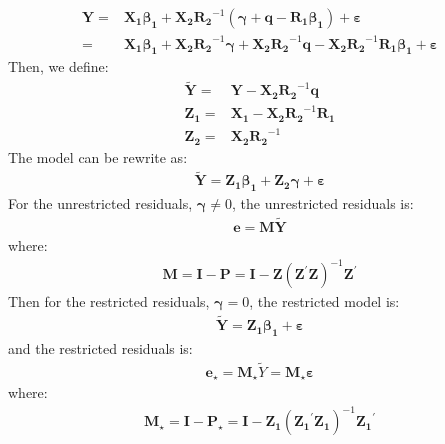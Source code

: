 \documentclass{article}
\begin{document}
	\begin{align*}
		\boldsymbol{Y} = &\boldsymbol{X_1} \boldsymbol{\beta_1} + \boldsymbol{X_2} \boldsymbol{R_2}^{-1}(\boldsymbol{\gamma} + \boldsymbol{q} - \boldsymbol{R_1}\boldsymbol{\beta_1}) + \boldsymbol{\varepsilon}\\ = &
		\boldsymbol{X_1} \boldsymbol{\beta_1} + \boldsymbol{X_2} \boldsymbol{R_2}^{-1} \boldsymbol{\gamma} + \boldsymbol{X_2} \boldsymbol{R_2}^{-1} \boldsymbol{q} - \boldsymbol{X_2} \boldsymbol{R_2}^{-1} \boldsymbol{R_1} \boldsymbol{\beta_1} + \boldsymbol{\varepsilon}
	\end{align*}
Then, we define:
	\begin{align*}
		\tilde{\boldsymbol{Y}} = &\boldsymbol{Y} - \boldsymbol{X_2} \boldsymbol{R_2}^{-1} \boldsymbol{q}\\
		\boldsymbol{Z_1} = &\boldsymbol{X_1} - \boldsymbol{X_2} \boldsymbol{R_2}^{-1} \boldsymbol{R_1}\\
		\boldsymbol{Z_2} = &\boldsymbol{X_2} \boldsymbol{R_2}^{-1}
	\end{align*}
The model can be rewrite as:
	\begin{align*}
		\tilde{\boldsymbol{Y}} = \boldsymbol{Z_1} \boldsymbol{\beta_1} + \boldsymbol{Z_2} \boldsymbol{\gamma} + \boldsymbol{\varepsilon}
	\end{align*}
For the unrestricted residuals, $\boldsymbol{\gamma} \neq 0$, the unrestricted residuals is:
 	\begin{align*}
 		\boldsymbol{e} = \boldsymbol{M} \tilde{\boldsymbol{Y}}
 	\end{align*}
 where:
 	\begin{align*}
 		\boldsymbol{M} = \boldsymbol{I} - \boldsymbol{P} = \boldsymbol{I} - \boldsymbol{Z}(\boldsymbol{Z}^\prime \boldsymbol{Z})^{-1} \boldsymbol{Z}^\prime
 	\end{align*}
Then for the restricted residuals, $\boldsymbol{\gamma} = 0$, the restricted model is:
	\begin{align*}
		\tilde{\boldsymbol{Y}} = \boldsymbol{Z_1} \boldsymbol{\beta_1} + \boldsymbol{\varepsilon}
	\end{align*}
and the restricted residuals is:
	\begin{align*}
		\boldsymbol{e}_\star = \boldsymbol{M}_\star \tilde{Y} = \boldsymbol{M}_\star \boldsymbol{\varepsilon}
	\end{align*}
where:
	\begin{align*}
		\boldsymbol{M}_\star = \boldsymbol{I} - \boldsymbol{P}_\star = \boldsymbol{I} - \boldsymbol{Z_1}(\boldsymbol{Z_1}^\prime \boldsymbol{Z_1})^{-1} \boldsymbol{Z_1}^\prime
	\end{align*}
\end{document}
